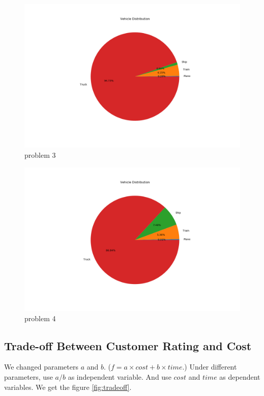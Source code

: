 \documentclass[11pt, a4paper]{article} %
\begin{document}
	\begin{figure}
		\centering
		\includegraphics[width=0.8\linewidth]{figure/vehicle3.png}
		\caption{problem 3}
		\label{fig:p3}
	\end{figure}
	\begin{figure}
		\centering
		\includegraphics[width=0.8\linewidth]{figure/vehicle4.png}
		\caption{problem 4}
		\label{fig:p4}
	\end{figure}

\subsection{Trade-off Between Customer Rating and Cost}
	We changed parameters $a$ and $b$. ($f=a\times cost+b\times time$.) Under different parameters, use $a/b$ as independent variable. And use $cost$ and $time$ as dependent variables. We get the figure \ref{fig:tradeoff}. 
	
\end{document}
